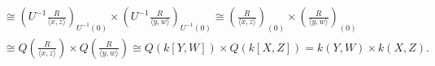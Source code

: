 \begin{example*}
\begin{enumerate}
\begin{align*}
                &\cong \left(U^{-1}\frac{R}{\langle x,z \rangle} \right)_{U^{-1}(0)} \times \left(U^{-1}\frac{R}{\langle y,w \rangle} \right)_{U^{-1}(0)} \cong \left(\frac{R}{\langle x,z \rangle}\right)_{(0)} \times \left(\frac{R}{\langle y,w \rangle}\right)_{(0)} \\
                &\cong Q\left(\frac{R}{\langle x,z \rangle}\right) \times Q\left(\frac{R}{\langle y,w \rangle}\right) \cong Q(k[Y,W]) \times Q(k[X,Z]) = k(Y,W) \times k(X,Z).
            \end{align*}
            \begin{comment}
            \par Let $R_1: = \frac{R}{\langle \overbar{X}, \overbar{Z} \rangle} \cong k[Y,W]$ and $R_2 := \frac{R}{\langle \overbar{Y}, \overbar{W} \rangle} \cong k[X,Z]$. Note $R_1$ is an integral domain and $U^{-1}R_1$ is a field. By UMP, there exists a unique ring homomorphism $\overbar{\varphi}_1$ such that the following diagram commutes. Also, since $\overbar{\varphi}_1 \neq 0$ and $\operatorname{Q}(R_1)$ is a field, $\overbar{\varphi}_1$ is 1-1. Let $\frac{r}{u} \in U^{-1}R_1$ with $r \in R$ and $u \in \pi_1(U) = \pi_1(R \smallsetminus (\langle \overbar{X},\overbar{Z} \rangle \cup \langle \overbar{Y}, \overbar{W} \rangle)) \subseteq R_1 \smallsetminus \{0\}$. Then $\frac{r}{u} \in \operatorname{Q}(R_1)$. Since $\overbar{\varphi}_1(\frac{r}{u}) = \frac{\varphi_1(r)}{\varphi_1(u)} = \frac{r/1}{u/1} = \frac{r}{u}$, we have $\overbar{\varphi_1}$ is onto. Hence $\operatorname{Q}(R_1) \cong U^{-1}R_1$. Similarly, $\operatorname{Q}(R_2) \cong U^{-1}R_2$.
             \begin{center}
                \begin{tikzpicture}[node distance = 1.5cm, auto]
                    \node (R) {$R_1$};
                    \node (QR)[right of=R] {$\operatorname{Q}(R_1)$};
                    \node (L)[below of=QR] {$U^{-1}R_1$};
                    \node (r)[node distance=0.7cm, left of=R, above of=R] {$r_1$};
                    \node (qr)[node distance=0.7cm, right of=QR, above of=QR] {$\frac{r_1}{1}$};
                    \node (qru)[node distance=1.6cm, right of=QR] {$\frac{r_1}{u_1}$};
                    \node (lu)[below of=qru] {$\frac{\varphi_1(r_1)}{\varphi_1(u_1)}$};
                    \node (l)[node distance=0.7cm, below of=L] {$r_1/1 = \frac{r_1/1}{1/1}$};
                    \draw[->] (R) to node {$\psi_1$} (QR);
                    \draw[right hook->] (R) to node [swap]{$\varphi_1$} (L);
                    \draw[->,dashed] (QR) to node {$\ex !\ \overbar \varphi_1$} (L);

\end{comment}
\end{enumerate}
\end{example*}
